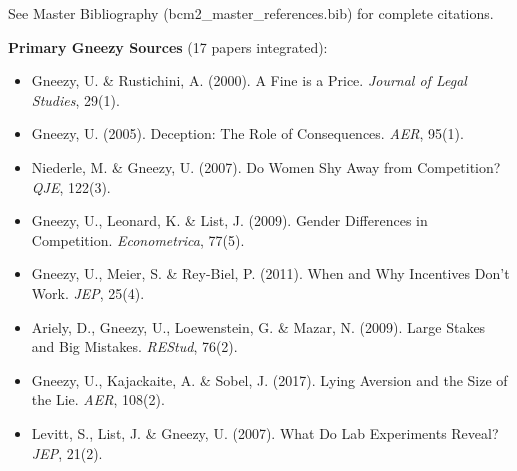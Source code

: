 See Master Bibliography (bcm2\_master\_references.bib) for complete citations.

\nocite{bcm_master}

\textbf{Primary Gneezy Sources} (17 papers integrated):

\begin{itemize}
    \item Gneezy, U. \& Rustichini, A. (2000). A Fine is a Price. \textit{Journal of Legal Studies}, 29(1).
    \item Gneezy, U. (2005). Deception: The Role of Consequences. \textit{AER}, 95(1).
    \item Niederle, M. \& Gneezy, U. (2007). Do Women Shy Away from Competition? \textit{QJE}, 122(3).
    \item Gneezy, U., Leonard, K. \& List, J. (2009). Gender Differences in Competition. \textit{Econometrica}, 77(5).
    \item Gneezy, U., Meier, S. \& Rey-Biel, P. (2011). When and Why Incentives Don't Work. \textit{JEP}, 25(4).
    \item Ariely, D., Gneezy, U., Loewenstein, G. \& Mazar, N. (2009). Large Stakes and Big Mistakes. \textit{REStud}, 76(2).
    \item Gneezy, U., Kajackaite, A. \& Sobel, J. (2017). Lying Aversion and the Size of the Lie. \textit{AER}, 108(2).
    \item Levitt, S., List, J. \& Gneezy, U. (2007). What Do Lab Experiments Reveal? \textit{JEP}, 21(2).
\end{itemize}



